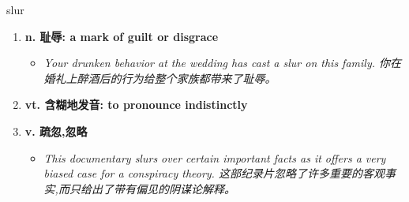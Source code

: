 
\begin{frame}
{\huge slur}
\begin{center}
\begin{enumerate}\Large
  \item \textbf{n. 耻辱: a mark of guilt or disgrace}
  \begin{itemize}
    \item \em{\Large{Your drunken behavior at the wedding has cast a slur on this family. 你在婚礼上醉酒后的行为给整个家族都带来了耻辱。}}
  \end{itemize}
  \item \textbf{vt. 含糊地发音: to pronounce indistinctly}
  \item \textbf{v. 疏忽,忽略}
  \begin{itemize}
    \item \em{\Large{This documentary slurs over certain important facts as it offers a very biased case for a conspiracy theory. 这部纪录片忽略了许多重要的客观事实,而只给出了带有偏见的阴谋论解释。}}
  \end{itemize}
\end{enumerate}
\end{center}
\end{frame}
